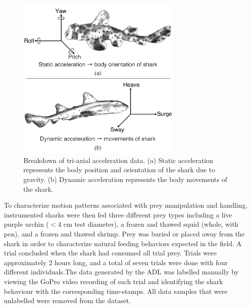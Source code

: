 \documentclass[conference]{IEEEtran}
\begin{document}
\begin{figure}[!hb]
	\centering
	\includegraphics[width=3.2in]{accel.pdf}
	\caption{Breakdown of tri-axial acceleration data. (a) Static acceleration represents the body position and orientation      of the shark due to gravity. (b) Dynamic acceleration represents the body movements of the shark.}
	\label{accel}
\end{figure} %

To characterize motion patterns associated with prey manipulation and handling, instrumented sharks were then fed three different prey types including a live purple urchin ($<4$ cm test diameter), a frozen and thawed squid (whole, with pen), and a frozen and thawed shrimp. Prey was buried or placed away from the shark in order to characterize natural feeding behaviors expected in the field. A trial concluded when the shark had consumed all trial prey. Trials were approximately 2 hours long, and a total of seven trials were done with four different individuals.The data generated by the ADL was labelled manually by viewing the GoPro video recording of each trial and identifying the shark behaviour with the corresponding time-stamps. All data samples that were unlabelled were removed from the dataset.  
\end{document}
